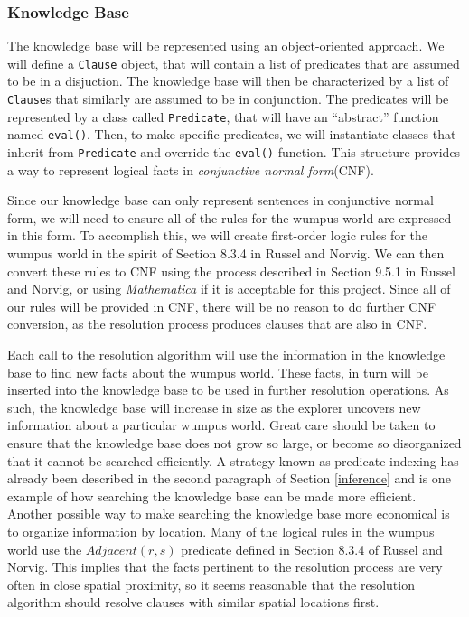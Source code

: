\documentclass{article}
\begin{document}
			\subsubsection{Knowledge Base}
			
				The knowledge base will be represented using an object-oriented approach.
				We will define a \texttt{Clause} object, that will contain a list of predicates that are assumed to be in a disjuction. The knowledge base will then be characterized by a list of \texttt{Clause}s that similarly are assumed to be in conjunction. 
				The predicates will be represented by a class called \texttt{Predicate}, that will have an ``abstract'' function named \texttt{eval()}.
				Then, to make specific predicates, we will instantiate classes that inherit from \texttt{Predicate} and override the \texttt{eval()} function.
				This structure provides a way to represent logical facts in \textit{conjunctive normal form}(CNF).
				
				Since our knowledge base can only represent sentences in conjunctive normal form, we will need to ensure all of the rules for the wumpus world are expressed in this form.
				To accomplish this, we will create first-order logic rules for the wumpus world in the spirit of Section 8.3.4 in Russel and Norvig.
				We can then convert these rules to CNF using the process described in Section 9.5.1 in Russel and Norvig, or using \textit{Mathematica} if it is acceptable for this project.
				Since all of our rules will be provided in CNF, there will be no reason to do further CNF conversion, as the resolution process produces clauses that are also in CNF.
				
				Each call to the resolution algorithm will use the information in the knowledge base to find new facts about the wumpus world.
				These facts, in turn will be inserted into the knowledge base to be used in further resolution operations.
				As such, the knowledge base will increase in size as the explorer uncovers new information about a particular wumpus world.
				Great care should be taken to ensure that the knowledge base does not grow so large, or become so disorganized that it cannot be searched efficiently.
				A strategy known as predicate indexing has already been described in the second paragraph of Section \ref{inference} and is one example of how searching the knowledge base can be made more efficient.
				Another possible way to make searching the knowledge base more economical is to organize information by location.
				Many of the logical rules in the wumpus world use the $Adjacent(r,s)$ predicate defined in Section 8.3.4 of Russel and Norvig.
				This implies that the facts pertinent to the resolution process are very often in close spatial proximity, so it seems reasonable that the resolution algorithm should resolve clauses with similar spatial locations first.
			
\end{document}
